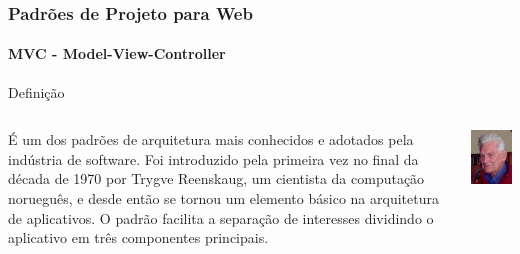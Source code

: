 \documentclass[
	10pt, %
	t, %
]{beamer}
\begin{document}
\begin{frame}
	\frametitle{Padrões de Projeto para Web}
	\framesubtitle{MVC - Model-View-Controller}

	\begin{block}{Definição}
	\begin{columns}[c] %
			\begin{column}{0.8\textwidth} %
				É um dos padrões de arquitetura mais conhecidos e adotados pela indústria de software. Foi introduzido pela primeira vez no final da década de 1970 por Trygve Reenskaug, um cientista da computação norueguês, e desde então se tornou um elemento básico na arquitetura de aplicativos. O padrão facilita a separação de interesses dividindo o aplicativo em três componentes principais.
			\end{column}

			\begin{column}{0.2\textwidth} %
				\includegraphics[width=0.9\linewidth]{Images/reenskaug.jpg}
			\end{column}
		\end{columns}
	\end{block}

\end{frame}
\end{document}
